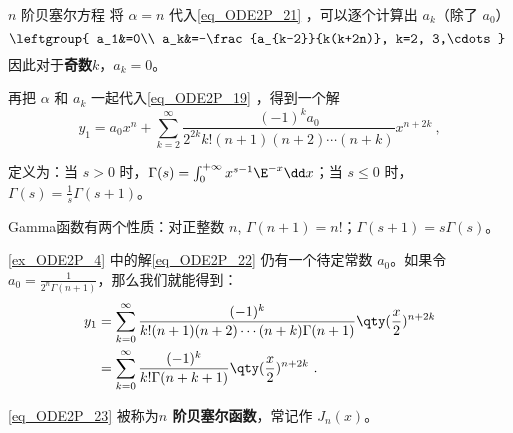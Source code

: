\begin{example}{$n$ 阶贝塞尔方程}
将 $\alpha=n$ 代入\autoref{eq_ODE2P_21} ，可以逐个计算出 $a_k$（除了 $a_0$）
\begin{equation}
\leftgroup{
    a_1&=0\\
    a_k&=-\frac{a_{k-2}}{k(k+2n)}, k=2, 3,\cdots
}~
\end{equation}
因此对于\textbf{奇数}$k$，$a_k=0$。

再把 $\alpha$ 和 $a_k$ 一起代入\autoref{eq_ODE2P_19} ，得到一个解
\begin{equation}\label{eq_ODE2P_22}
y_1=a_0x^n+\sum\limits^\infty_{k=2}\frac{(-1)^ka_0}{2^{2k}k!(n+1)(n+2)\cdots(n+k)}x^{n+2k}~,
\end{equation}


定义为：当 $s>0$ 时，$\Gamma(s)=\int_0^{+\infty}x^{s-1}\E^{-x}\dd x$；当 $s\leq 0$ 时，$\Gamma(s)=\frac{1}{s}\Gamma(s+1)$。

Gamma函数有两个性质：对正整数 $n$, $\Gamma(n+1)=n!$；$\Gamma(s+1)=s\Gamma(s)$。

\autoref{ex_ODE2P_4}  中的解\autoref{eq_ODE2P_22} 仍有一个待定常数 $a_0$。如果令 $a_0=\frac{1}{2^n\Gamma(n+1)}$，那么我们就能得到：
\begin{equation}\label{eq_ODE2P_23}
\begin{aligned}
y_1&=\sum\limits^\infty_{k=0}\frac{(-1)^k}{k!(n+1)(n+2)\cdots(n+k)\Gamma(n+1)}\qty(\frac{x}{2})^{n+2k}\\
 &=\sum\limits^\infty_{k=0}\frac{(-1)^k}{k!\Gamma(n+k+1)}\qty(\frac{x}{2})^{n+2k}~.
\end{aligned}
\end{equation}

\autoref{eq_ODE2P_23} 被称为\textbf{$n$ 阶贝塞尔函数}，常记作 $J_n(x)$。


\end{example}



